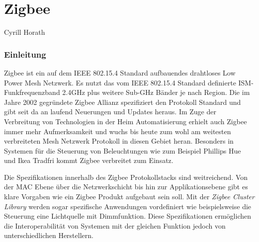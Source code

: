 \vspace*{4cm}
\part{Zigbee}\label{part:Zigbee}
Cyrill Horath
\vspace*{\fill}
\clearpage

\section{Einleitung}\label{sec:EinleitungZigbee}

Zigbee ist ein auf dem IEEE 802.15.4 Standard aufbauendes drahtloses Low Power Mesh Netzwerk. Es nutzt das vom IEEE 802.15.4 Standard definierte ISM-Funkfrequenzband 2.4GHz plus weitere Sub-GHz Bänder je nach Region.
Die im Jahre 2002 gegründete Zigbee Allianz spezifiziert den Protokoll Standard und gibt seit da an laufend Neuerungen und Updates heraus.
Im Zuge der Verbreitung von Technologien in der Heim Automatisierung erhielt auch Zigbee immer mehr Aufmerksamkeit und wuchs bis heute zum wohl am weitesten verbreiteten Mesh Netzwerk Protokoll in diesen Gebiet heran. Besonders in Systemen für die Steuerung von Beleuchtungen wie zum Beispiel Phillips Hue und Ikea Tradfri kommt Zigbee verbreitet zum Einsatz.

Die Spezifikationen innerhalb des Zigbee Protokollstacks sind weitreichend. Von der MAC Ebene über die Netzwerkschicht bis hin zur Applikationsebene gibt es klare Vorgaben wie ein Zigbee Produkt aufgebaut sein soll.
Mit der \textit{Zigbee Cluster Library} werden sogar spezifische Anwendungen vordefiniert wie beispielsweise die Steuerung eine Lichtquelle mit Dimmfunktion.
Diese Spezifikationen ermöglichen die Interoperabilität von Systemen mit der gleichen Funktion jedoch von unterschiedlichen Herstellern.




